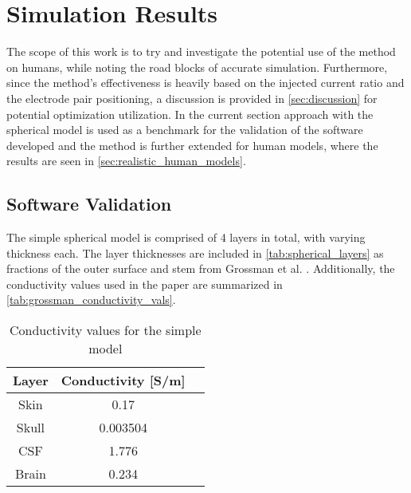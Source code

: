 \pagebreak
\chapter{Simulation Results}

The scope of this work is to try and investigate the potential use of the  method on humans, while noting the road blocks of accurate simulation. Furthermore, since the method's effectiveness is heavily based on the injected current ratio and the electrode pair positioning, a discussion is provided in \autoref{sec:discussion} for potential optimization utilization. In the current section  approach with the spherical model is used as a benchmark for the validation of the software developed and the method is further extended for human models, where the results are seen in \autoref{sec:realistic_human_models}.

\section{Software Validation}

The simple spherical model is comprised of 4 layers in total, with varying thickness each. The layer thicknesses are included in \autoref{tab:spherical_layers} as fractions of the outer surface and stem from Grossman et al. \cite[Figure S2, J, and K]{Grossman2017}. Additionally, the conductivity values used in the paper are summarized in \autoref{tab:grossman_conductivity_vals}.

\begin{table}[!ht]
\centering
\caption{Conductivity values for the simple model \cite{ITstissue}}
\label{tab:grossman_conductivity_vals}
\begin{tabular}{|c|c|c|}
    \hline
    \rowcolor[HTML]{C0C0C0} 
    {\color[HTML]{000000} \textbf{Layer}} & {\color[HTML]{000000} \textbf{Conductivity {[}S/m{]}}} \\ \hline
    Skin & 0.17 \\ \hline
    Skull & 0.003504 \\ \hline
    CSF & 1.776 \\ \hline
    Brain & 0.234 \\ \hline
\end{tabular}
\end{table}

